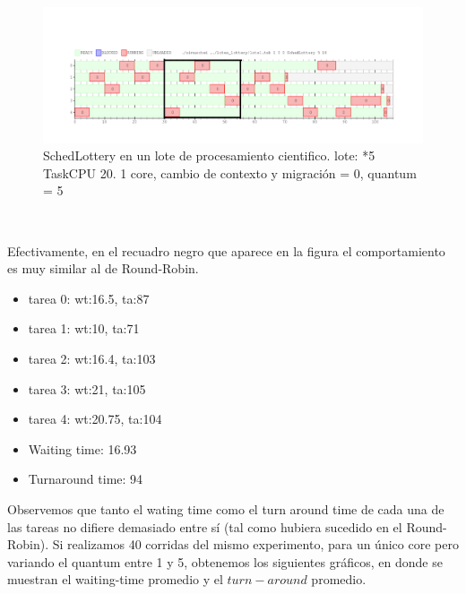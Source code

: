 \begin{figure}[H]
  \centering\includegraphics[scale=0.5]{graficos/lottery_cpu.pdf}
  \caption{SchedLottery en un lote de procesamiento cientifico. lote: *5 TaskCPU 20.
	1 core, cambio de contexto y migración = 0, quantum = 5}
\end{figure}

~

Efectivamente, en el recuadro negro que aparece en la figura el comportamiento es muy similar al de Round-Robin.

\begin{itemize}
	\item tarea 0: wt:16.5, ta:87
	\item tarea 1: wt:10, ta:71
	\item tarea 2: wt:16.4, ta:103
	\item tarea 3: wt:21, ta:105
	\item tarea 4: wt:20.75, ta:104
	\item  Waiting time: 16.93
	\item  Turnaround time: 94
\end{itemize} 

Observemos que tanto el wating time como el turn around time de cada una de las tareas no difiere demasiado entre sí (tal como hubiera sucedido en el Round-Robin).
Si realizamos 40 corridas del mismo experimento, para un único core pero variando el quantum entre 1 y 5, obtenemos los siguientes gráficos, en donde se muestran
el waiting-time promedio y el $turn-around$ promedio.


\FloatBarrier


